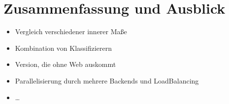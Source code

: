\chapter{Zusammenfassung und Ausblick}
\label{cha:ausblick}

\TODO

\begin{itemize}
  \item Vergleich verschiedener innerer Maße
  \item Kombination von Klassifizierern
  \item Version, die ohne Web auskommt
  \item Parallelisierung durch mehrere Backends und LoadBalancing
  \item \dots
\end{itemize}